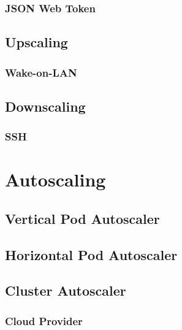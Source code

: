 \subsubsection{JSON Web Token}
\label{subsubsec:implementation_server_node_registration_json_web_token}

\subsection{Upscaling}
\label{subsec:implementation_server_upscaling}

\subsubsection{Wake-on-LAN}
\label{subsubsec:implementation_server_scale_up_wake_on_lan}

\subsection{Downscaling}
\label{subsec:implementation_server_downscaling}

\subsubsection{SSH}
\label{subsubsec:implementation_server_scale_up_ssh}

\section{Autoscaling}
\label{sec:implementation_autoscaling}

\subsection{Vertical Pod Autoscaler}
\label{subsec:implementation_autoscaling_vertical_pod_autoscaler}

\subsection{Horizontal Pod Autoscaler}
\label{subsec:implementation_autoscaling_horizontal_pod_autoscaler}

\subsection{Cluster Autoscaler}
\label{subsec:implementation_autoscaling_cluster_autoscaler}

\subsubsection{Cloud Provider}
\label{subsubsec:implementation_autoscaling_cluster_autoscaler_cloud_provider}


